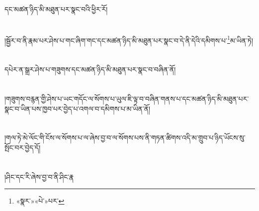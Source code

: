 དང་མཚན་ཉིད་མི་མཐུན་པར་སྣང་བའི་ཕྱིར་རོ།\chapter{ }།སྦྱོར་བ་ནི་རྣམ་པར་ཤེས་པ་གང་ཞིག་གང་དང་མཚན་ཉིད་མི་མཐུན་པར་སྣང་བ་དེ་ནི་དེའི་དམིགས་པ་\footnote{«སྣར་»«པེ་»པར་}མ་ཡིན་ཏེ།\chapter{ }དཔེར་ན་སྒྲར་ཤེས་པ་གཟུགས་དང་མཚན་ཉིད་མི་མཐུན་པར་སྣང་བ་བཞིན་ནོ།\chapter{ }།གཟུགས་བརྙན་གྱི་ཤེས་པ་ཡང་གདོང་ལ་སོགས་པ་ཡུལ་ཇི་ལྟ་བ་བཞིན་གནས་པ་དང་མཚན་ཉིད་མི་མཐུན་པར་སྣང་བ་ཡིན་པས་ཁྱབ་པར་བྱེད་པ་འགལ་བ་དམིགས་པ་མ་ཡིན་ནོ།\chapter{ }།གལ་ཏེ་མེ་ལོང་གི་ངོས་ལ་སོགས་པ་ལ་ཞེས་བྱ་བ་ལ་སོགས་པས་ནི་གཏན་ཚིགས་འདི་མ་གྲུབ་པ་ཉིད་ཡོངས་སུ་སྤོང་བར་བྱེད་དོ།\chapter{ }།ཤིང་དང་རི་ཞེས་བྱ་བ་ནི་ཤིང་རྣ
